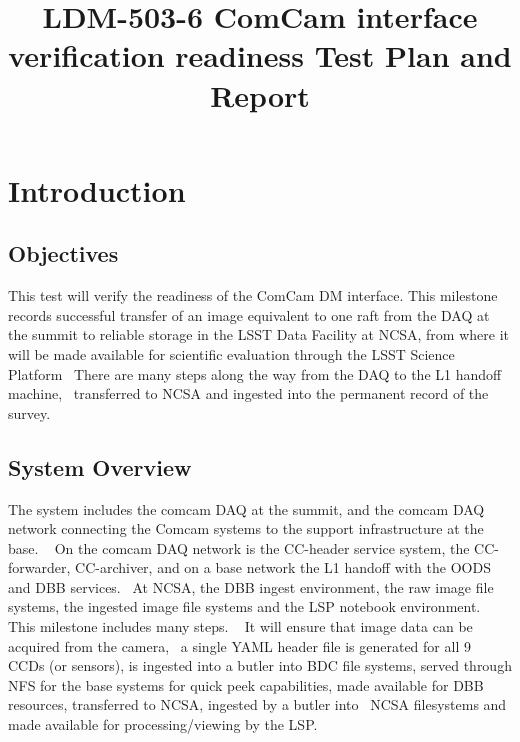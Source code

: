 \documentclass[DM,lsstdraft,STR,toc]{lsstdoc}
\begin{document}
\def\milestoneName{ComCam interface verification readiness}
\def\milestoneId{LDM-503-6}
\def\product{Data Management}


\title{ LDM-503-6 ComCam interface verification readiness Test Plan and Report}
\setDocRef{\lsstDocType-\lsstDocNum}
\date{\vcsdate}
\author{  }






\maketitle

\section{Introduction}
\label{sect:intro}


\subsection{Objectives}
\label{sect:objectives}

This test will verify the readiness of the ComCam DM interface. This
milestone records successful transfer of an image equivalent to one raft
from the DAQ at the summit to reliable storage in the LSST Data Facility
at NCSA, from where it will be made available for scientific evaluation
through the LSST Science Platform ~There are many steps along the way
from the DAQ to the L1 handoff machine, ~transferred to NCSA and
ingested into the permanent record of the survey. ~~



\subsection{System Overview}
\label{sect:systemoverview}

The system includes the comcam DAQ at the summit, and the comcam DAQ
network connecting the Comcam systems to the support infrastructure at
the base. ~ On the comcam DAQ network is the CC-header service system,
the CC-forwarder, CC-archiver, and on a base network the L1 handoff with
the OODS and DBB services. ~At NCSA, the DBB ingest environment, the raw
image file systems, the ingested image file systems and the LSP notebook
environment. ~ This milestone includes many steps. ~ It will ensure that
image data can be acquired from the camera, ~a single YAML header file
is generated for all 9 CCDs (or sensors), is ingested into a butler into
BDC file systems, served through NFS for the base systems for quick peek
capabilities, made available for DBB resources, transferred to NCSA,
ingested by a butler into ~NCSA filesystems and made available for
processing/viewing by the LSP. ~\\[2\baselineskip]
\end{document}
